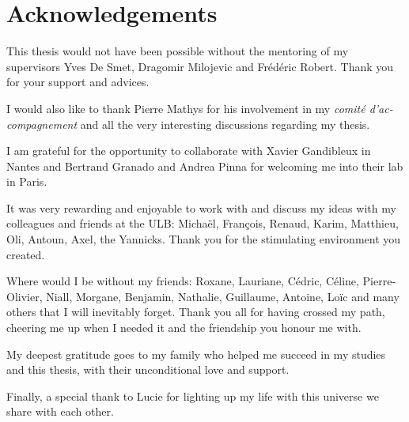 \chapter{Acknowledgements}

This thesis would not have been possible without the mentoring of my supervisors Yves De Smet, Dragomir Milojevic and Frédéric Robert. Thank you for your support and advices.

I would also like to thank Pierre Mathys for his involvement in my \textit{comité d'ac-compagnement} and all the very interesting discussions regarding my thesis.

I am grateful for the opportunity to collaborate with Xavier Gandibleux in Nantes and Bertrand Granado and Andrea Pinna for welcoming me into their lab in Paris.

It was very rewarding and enjoyable to work with and discuss my ideas with my colleagues and friends at the ULB: Michaël, François, Renaud, Karim, Matthieu, Oli, Antoun, Axel, the Yannicks. Thank you for the stimulating environment you created.

Where would I be without my friends: Roxane, Lauriane, Cédric, Céline, Pierre-Olivier, Niall, Morgane, Benjamin, Nathalie, Guillaume, Antoine, Loïc and many others that I will inevitably forget. Thank you all for having crossed my path, cheering me up when I needed it and the friendship you honour me with.

My deepest gratitude goes to my family who helped me succeed in my studies and this thesis, with their unconditional love and support.

Finally, a special thank to Lucie for lighting up my life with this universe we share with each other.